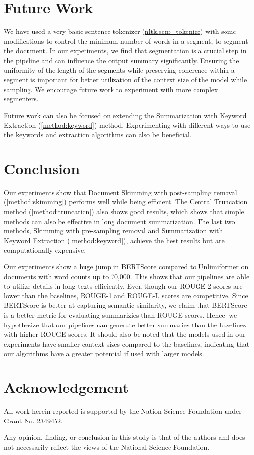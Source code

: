 \section{Future Work}
	\label{sec:future-work}

	We have used a very basic sentence tokenizer
	(\href{https://www.nltk.org/api/nltk.tokenize.sent_tokenize.html}{nltk.sent\_tokenize})
	with some modifications to control the minimum number of words in a segment, to segment
	the document.
	In our experiments, we find that segmentation is a crucial step in the pipeline and can
	influence the output summary significantly.
	Ensuring the uniformity of the length of the segments while preserving coherence within a
	segment is important for better utilization of the context size of the model while sampling.
	We encourage future work to experiment with more complex segmenters.

	Future work can also be focused on extending the Summarization with Keyword Extraction
	(\ref{method:keyword}) method.
	Experimenting with different ways to use the keywords and extraction algorithms can also be
	beneficial.


\section{Conclusion}
\label{sec:conclusion}

	Our experiments show that Document Skimming with post-sampling removal (\ref{method:skimming})
	performs well while being efficient.
	The Central Truncation method (\ref{method:truncation}) also shows good results, which
	shows that simple methods can also be effective in long document summarization.
	The last two methods, Skimming with pre-sampling removal and Summarization with Keyword
	Extraction (\ref{method:keyword}), achieve the best results but are computationally expensive.

	Our experiments show a huge jump in BERTScore compared to Unlimiformer on documents with
	word counts up to 70,000.
	This shows that our pipelines are able to utilize details in long texts efficiently.
	Even though our ROUGE-2 scores are lower than the baselines, ROUGE-1 and ROUGE-L scores are
	competitive.
	Since BERTScore is better at capturing semantic similarity, we claim that BERTScore is a
	better metric for evaluating summarizies than ROUGE scores.
	Hence, we hypothesize that our pipelines can generate better summaries than the baselines
	with higher ROUGE scores.
	It should also be noted that the models used in our experiments have smaller context sizes
	compared to the baselines, indicating that our algorithms have a greater potential if
	used with larger models.


\section*{Acknowledgement}

	All work herein reported is supported by the Nation Science Foundation under Grant
	No. 2349452.

	Any opinion, finding, or conclusion in this study is that of the authors and does not
	necessarily reflect the views of the National Science Foundation.
